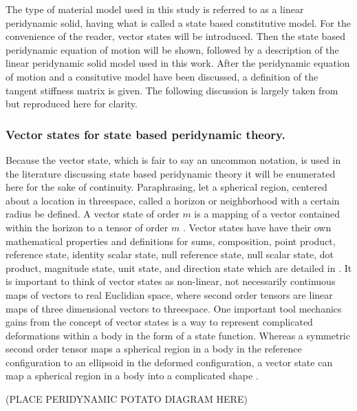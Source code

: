\documentclass[preprint,12pt]{elsarticle}
\begin{document}
The type of material model used in this study is referred to as a linear
peridynamic solid, having what is called a state based constitutive model. For
the convenience of the reader, vector states will be introduced. Then the state
based peridynamic equation of motion will be shown, followed by a description
of the linear peridynamic solid model used in this work. After the peridynamic
equation of motion and a consitutive model have been discussed, a definition of
the tangent stiffness matrix is given. The following discussion is largely
taken from \cite{silling:psa} but reproduced here for clarity.

\subsubsection{Vector states for state based peridynamic theory.}
Because the vector state, which is fair to say an uncommon notation, is used in the literature discussing state based peridynamic theory
it will be enumerated here for the sake of continuity. 
%
Paraphrasing, let a spherical region, centered about a
location in threespace, called a horizon or neighborhood with a certain radius
be defined. A vector state of order $m$ is a mapping of a vector contained
within the horizon to a tensor of order $m$ \cite{silling:psa}. Vector states
have have their own mathematical properties and definitions for sums, composition,
point product, reference state, identity scalar state, null reference state, null scalar state,
dot product, magnitude state, unit state, and direction state which are detailed in \cite{silling:psa}. 
It is important to think of vector states as non-linear, not necessarily continuous maps of vectors to real Euclidian space, where second order tensors are linear maps of three dimensional vectors to threespace. 
%
One important tool mechanics gains from the concept of vector states is a way
to represent complicated deformations within a body in the form of a state
function. Whereas a symmetric second order tensor maps a spherical region in a
body in the reference configuration to an ellipsoid in the deformed
configuration, a vector state can map a spherical region in a body into a
complicated shape \cite{silling:psa}.

(PLACE PERIDYNAMIC POTATO DIAGRAM HERE)
\end{document}
